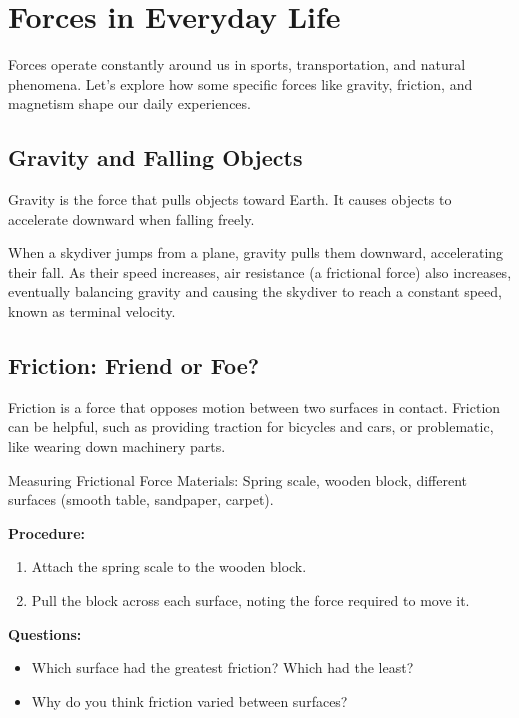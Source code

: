 \section{Forces in Everyday Life}

Forces operate constantly around us in sports, transportation, and natural phenomena. Let's explore how some specific forces like gravity, friction, and magnetism shape our daily experiences.

\subsection{Gravity and Falling Objects}

Gravity is the force that pulls objects toward Earth. It causes objects to accelerate downward when falling freely.

\begin{example}
When a skydiver jumps from a plane, gravity pulls them downward, accelerating their fall. As their speed increases, air resistance (a frictional force) also increases, eventually balancing gravity and causing the skydiver to reach a constant speed, known as terminal velocity.
\end{example}

\subsection{Friction: Friend or Foe?}

Friction is a force that opposes motion between two surfaces in contact. Friction can be helpful, such as providing traction for bicycles and cars, or problematic, like wearing down machinery parts.

\begin{investigation}{Measuring Frictional Force}
Materials: Spring scale, wooden block, different surfaces (smooth table, sandpaper, carpet).

\textbf{Procedure:}
\begin{enumerate}
    \item Attach the spring scale to the wooden block.
    \item Pull the block across each surface, noting the force required to move it.
\end{enumerate}

\textbf{Questions:}
\begin{itemize}
    \item Which surface had the greatest friction? Which had the least?
    \item Why do you think friction varied between surfaces?
\end{itemize}
\end{investigation}

